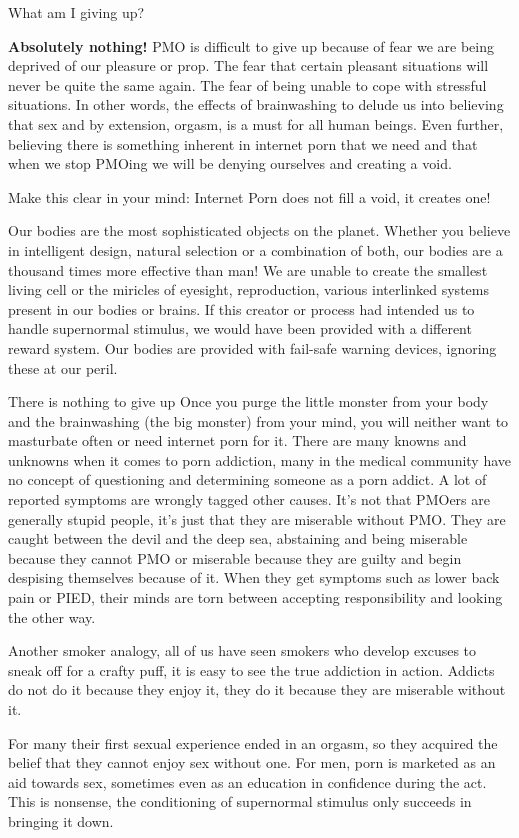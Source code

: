 What am I giving up?

\textbf{Absolutely nothing!} PMO is difficult to give up because of fear we are being deprived of our pleasure or prop. The fear that certain pleasant situations will never be quite the same again. The fear of being unable to cope with stressful situations. In other words, the effects of brainwashing to delude us into believing that sex and by extension, orgasm, is a must for all human beings. Even further, believing there is something inherent in internet porn that we need and that when we stop PMOing we will be denying ourselves and creating a void.

Make this clear in your mind:
  \huge{Internet Porn does not fill a void, it creates one!}

Our bodies are the most sophisticated objects on the planet. Whether you believe in intelligent design, natural selection or a combination of both, our bodies are a thousand times more effective than man! We are unable to create the smallest living cell or the miricles of eyesight, reproduction, various interlinked systems present in our bodies or brains. If this creator or process had intended us to handle supernormal stimulus, we would have been provided with a different reward system. Our bodies are provided with fail-safe warning devices, ignoring these at our peril.

There is nothing to give up
Once you purge the little monster from your body and the brainwashing (the big monster) from your mind, you will neither want to masturbate often or need internet porn for it. There are many knowns and unknowns when it comes to porn addiction, many in the medical community have no concept of questioning and determining someone as a porn addict. A lot of reported symptoms are wrongly tagged other causes. It's not that PMOers are generally stupid people, it's just that they are miserable without PMO. They are caught between the devil and the deep sea, abstaining and being miserable because they cannot PMO or miserable because they are guilty and begin despising themselves because of it. When they get symptoms such as lower back pain or PIED, their minds are torn between accepting responsibility and looking the other way.

Another smoker analogy, all of us have seen smokers who develop excuses to sneak off for a crafty puff, it is easy to see the true addiction in action. Addicts do not do it because they enjoy it, they do it because they are miserable without it.

For many their first sexual experience ended in an orgasm, so they acquired the belief that they cannot enjoy sex without one. For men, porn is marketed as an aid towards sex, sometimes even as an education in confidence during the act. This is nonsense, the conditioning of supernormal stimulus only succeeds in bringing it down.

